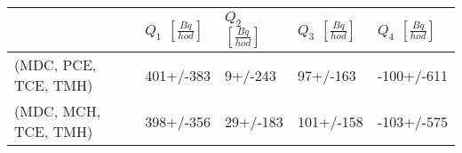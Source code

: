\begin{tabular}{lllll}
\toprule
{} & $Q_1$ $\left[\si{\frac{Bq}{hod}}\right]$ & $Q_2$ $\left[\si{\frac{Bq}{hod}}\right]$ & $Q_3$ $\left[\si{\frac{Bq}{hod}}\right]$ & $Q_4$ $\left[\si{\frac{Bq}{hod}}\right]$ \\
\midrule
(MDC, PCE, TCE, TMH) &                                401+/-383 &                                  9+/-243 &                                 97+/-163 &                               -100+/-611 \\
(MDC, MCH, TCE, TMH) &                                398+/-356 &                                 29+/-183 &                                101+/-158 &                               -103+/-575 \\
\bottomrule
\end{tabular}
